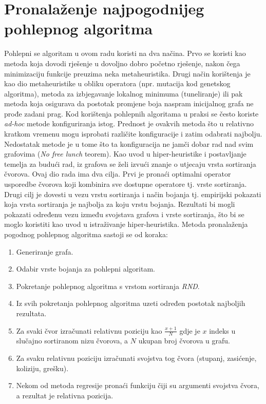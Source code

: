 \documentclass[times, utf8, diplomski, numeric]{fer}
\begin{document}
\section{Pronalaženje najpogodnijeg pohlepnog algoritma}
\label{sec:ml}
Pohlepni se algoritam u ovom radu koristi na dva načina. Prvo se koristi kao metoda koja dovodi rješenje u dovoljno dobro početno rješenje, nakon čega minimizaciju funkcije preuzima neka metaheuristika. Drugi način korištenja je kao dio metaheuristike u obliku operatora (npr. mutacija kod genetskog algoritma), metoda za izbjegavanje lokalnog minimuma (tuneliranje) ili pak metoda koja osigurava da postotak promjene boja naspram inicijalnog grafa ne prođe zadani prag. Kod korištenja pohlepnih algoritama u praksi se često koriste \emph{ad-hoc} metode konfiguriranja istog. Prednost je ovakvih metoda što u relativno kratkom vremenu mogu isprobati različite konfiguracije i zatim odabrati najbolju. Nedostatak metode je u tome što ta konfiguracija ne jamči dobar rad nad svim grafovima (\emph{No free lunch} teorem). Kao uvod u hiper-heuristike i postavljanje temelja za budući rad, iz grafova se želi izvući znanje o utjecaju vrsta sortiranja čvorova. Ovaj dio rada ima dva cilja. Prvi je pronaći optimalni operator usporedbe čvorova koji kombinira sve dostupne operatore tj. vrste sortiranja. Drugi cilj je dovesti u vezu vrstu sortiranja i način bojanja tj. empirijski pokazati koja vrsta sortiranja je najbolja za koju vrstu bojanja. Rezultati bi mogli pokazati određenu vezu između svojstava grafova i vrste sortiranja, što bi se moglo koristiti kao uvod u istraživanje hiper-heuristika. Metoda pronalaženja pogodnog pohlepnog algoritma sastoji se od koraka:

\begin{enumerate}
	\item Generiranje grafa.
	\item Odabir vrste bojanja za pohlepni algoritam.
	\item Pokretanje pohlepnog algoritma s vrstom sortiranja \emph{RND}.
	\item Iz svih pokretanja pohlepnog algoritma uzeti određen postotak najboljih rezultata.
	\item Za svaki čvor izračunati relativnu poziciju kao $\frac{x+1}{N}$ gdje je $x$ indeks u slučajno sortiranom nizu čvorova, a $N$ ukupan broj čvorova u grafu. 
	\item Za svaku relativnu poziciju izračunati svojstva tog čvora (stupanj, zasićenje, koliziju, grešku).
	\item Nekom od metoda regresije pronaći funkciju čiji su argumenti svojstva čvora, a rezultat je relativna pozicija.
\end{enumerate}
\end{document}
